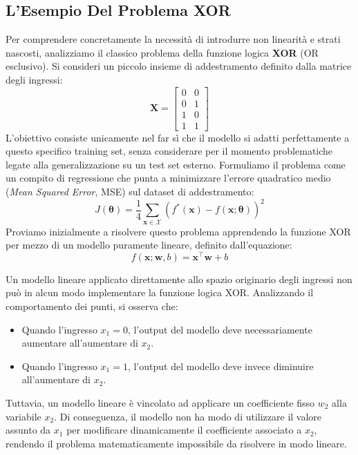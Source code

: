 ﻿\documentclass[11pt, a4paper]{article}
\begin{document}
\subsection{L'Esempio Del Problema XOR}

Per comprendere concretamente la necessità di introdurre non linearità e strati nascosti, analizziamo il classico problema della funzione logica \textbf{XOR} (OR esclusivo). Si consideri un piccolo insieme di addestramento definito dalla matrice degli ingressi:
\[
\bm{X} = \begin{bmatrix} 0 & 0 \\ 0 & 1 \\ 1 & 0 \\ 1 & 1 \end{bmatrix}
\]
L'obiettivo consiste unicamente nel far sì che il modello si adatti perfettamente a questo specifico training set, senza considerare per il momento problematiche legate alla generalizzazione su un test set esterno. Formuliamo il problema come un compito di regressione che punta a minimizzare l'errore quadratico medio (\emph{Mean Squared Error}, MSE) sul dataset di addestramento:
\[
J(\bm{\theta}) = \frac{1}{4} \sum_{\bm{x} \in \mathcal{X}} \left( f^*(\bm{x}) - f(\bm{x}; \bm{\theta}) \right)^2
\]
Proviamo inizialmente a risolvere questo problema apprendendo la funzione XOR per mezzo di un modello puramente lineare, definito dall'equazione:
\[
f(\bm{x}; \bm{w}, b) = \bm{x}^\top \bm{w} + b
\]


Un modello lineare applicato direttamente allo spazio originario degli ingressi non può in alcun modo implementare la funzione logica XOR. Analizzando il comportamento dei punti, si osserva che:
\begin{itemize}[noitemsep]
    \item Quando l'ingresso $x_1 = 0$, l'output del modello deve necessariamente aumentare all'aumentare di $x_2$.
    \item Quando l'ingresso $x_1 = 1$, l'output del modello deve invece diminuire all'aumentare di $x_2$.
\end{itemize}
Tuttavia, un modello lineare è vincolato ad applicare un coefficiente fisso $w_2$ alla variabile $x_2$. Di conseguenza, il modello non ha modo di utilizzare il valore assunto da $x_1$ per modificare dinamicamente il coefficiente associato a $x_2$, rendendo il problema matematicamente impossibile da risolvere in modo lineare.
\end{document}
